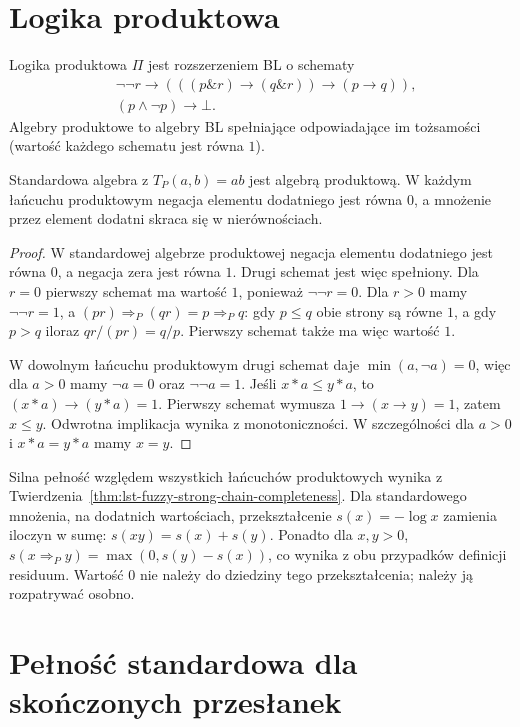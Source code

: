 \section{Logika produktowa}
\begin{definicja}\label{def:lst-fuzzy-product-logic}
Logika produktowa $\Pi$ jest rozszerzeniem BL o schematy
\begin{align*}
 &\neg\neg r\to
 (((p\mathbin{\&}r)\to(q\mathbin{\&}r))\to(p\to q)),\\
 &(p\wedge\neg p)\to\bot.
\end{align*}
Algebry produktowe to algebry BL spełniające odpowiadające
im tożsamości (wartość każdego schematu jest równa $1$).
\end{definicja}
\begin{stwierdzenie}\label{prop:lst-fuzzy-product-sound}
Standardowa algebra z $T_P(a,b)=ab$ jest algebrą produktową.
W każdym łańcuchu produktowym negacja elementu dodatniego
jest równa $0$, a mnożenie przez element dodatni
skraca się w nierównościach.
\end{stwierdzenie}
\begin{proof}
W standardowej algebrze produktowej negacja elementu
dodatniego jest równa $0$, a negacja zera jest równa $1$.
Drugi schemat jest więc spełniony. Dla $r=0$ pierwszy
schemat ma wartość $1$, ponieważ $\neg\neg r=0$.
Dla $r>0$ mamy $\neg\neg r=1$, a
$(pr)\Rightarrow_P(qr)=p\Rightarrow_P q$: gdy $p\leq q$
obie strony są równe $1$, a gdy $p>q$ iloraz $qr/(pr)=q/p$.
Pierwszy schemat także ma więc wartość $1$.

W dowolnym łańcuchu produktowym drugi schemat daje
$\min(a,\neg a)=0$, więc dla $a>0$ mamy $\neg a=0$
oraz $\neg\neg a=1$. Jeśli $x*a\leq y*a$, to
$(x*a)\to(y*a)=1$. Pierwszy schemat wymusza
$1\to(x\to y)=1$, zatem $x\leq y$.
Odwrotna implikacja wynika z monotoniczności.
W szczególności dla $a>0$ i $x*a=y*a$ mamy $x=y$.
\end{proof}
Silna pełność względem wszystkich łańcuchów produktowych
wynika z Twierdzenia~\ref{thm:lst-fuzzy-strong-chain-completeness}.
Dla standardowego mnożenia, na dodatnich wartościach,
przekształcenie $s(x)=-\log x$ zamienia iloczyn w sumę:
$s(xy)=s(x)+s(y)$. Ponadto dla $x,y>0$,
$s(x\Rightarrow_P y)=\max(0,s(y)-s(x))$,
co wynika z obu przypadków definicji residuum.
Wartość $0$ nie należy do dziedziny tego przekształcenia;
należy ją rozpatrywać osobno.

\section{Pełność standardowa dla skończonych przesłanek}
